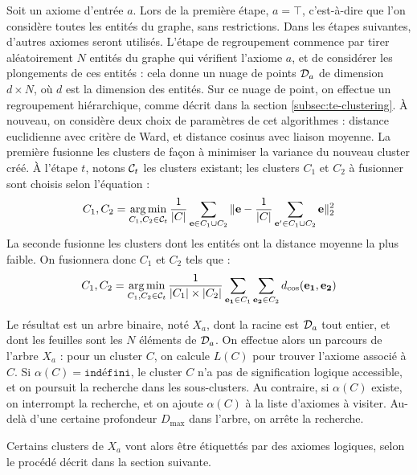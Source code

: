 Soit un axiome d'entrée $a$. Lors de la première étape, $a = \top$, c'est-à-dire que l'on considère toutes les entités du graphe, sans restrictions. Dans les étapes suivantes, d'autres axiomes seront utilisés.
L'étape de regroupement commence par tirer aléatoirement $N$ entités du graphe qui vérifient l'axiome $a$, et de considérer les plongements de ces entités : cela donne un nuage de points $\cal{D}_a$ de dimension $d \times N$, où $d$ est la dimension des entités. Sur ce nuage de point, on effectue un regroupement hiérarchique, comme décrit dans la section \ref{subsec:te-clustering}. À nouveau, on considère deux choix de paramètres de cet algorithmes : distance euclidienne avec critère de Ward, et distance cosinus avec liaison moyenne. La première fusionne les clusters de façon à minimiser la variance du nouveau cluster créé. À l'étape $t$, notons $\cal{C}_t$ les clusters existant; les clusters $C_1$ et $C_2$ à fusionner sont choisis selon l'équation :
\begin{equation}
    C_1, C_2 = \argmin_{C_1, C_2 \in \cal{C}_t} 
    \frac{1}{| C |} \sum_{\bf{e} \in C_1 \cup C_2} \| \bf{e} - \frac{1}{| C |} \sum_{\bf{e'} \in C_1 \cup C_2} \bf{e} \|_2^2 
\end{equation}
La seconde fusionne les clusters dont les entités ont la distance moyenne la plus faible. On fusionnera donc $C_1$ et $C_2$ tels que :
\begin{equation}
    C_1, C_2 = \argmin_{C_1, C_2 \in \cal{C}_t} \frac{1}{|C_1| \times |C_2|} \sum_{\bf{e_1}\in C_1} \sum_{\bf{e_2} \in C_2} d_\text{cos}(\bf{e_1, e_2})
\end{equation}

Le résultat est un arbre binaire, noté $X_a$, dont la racine est $\cal{D}_a$ tout entier, et dont les feuilles sont les $N$ éléments de $\cal{D}_a$. On effectue alors un parcours de l'arbre $X_a$ : pour un cluster $C$, on calcule $L(C)$ pour trouver l'axiome associé à $C$. Si $\alpha(C) = \texttt{indéfini}$, le cluster $C$ n'a pas de signification logique accessible, et on poursuit la recherche dans les sous-clusters. Au contraire, si $\alpha(C)$ existe, on interrompt la recherche, et on ajoute $\alpha(C)$ à la liste d'axiomes à visiter. Au-delà d'une certaine profondeur $D_\text{max}$ dans l'arbre, on arrête la recherche. 

Certains clusters de $X_a$ vont alors être étiquettés par des axiomes logiques, selon le procédé décrit dans la section suivante. 

